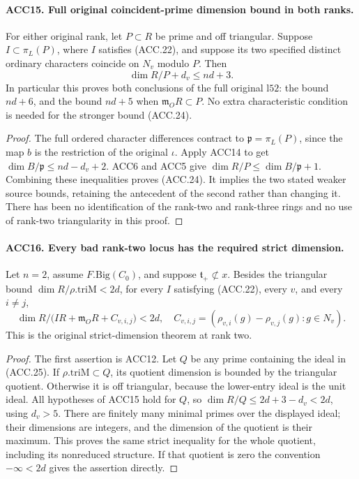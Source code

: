 \paragraph{ACC15. Full original coincident-prime dimension bound in both ranks.}
\label{claim:ACC15}
For either original rank, let \(P\subset R\) be prime and
off triangular.  Suppose \(I\subset\pi_L(P)\), where \(I\)
satisfies (ACC.22), and suppose its two specified distinct ordinary
characters coincide on \(N_v\) modulo \(P\).  Then
\[
                            \dim R/P+d_v\le nd+3.         \tag{ACC.24}
\]
In particular this proves both conclusions of the full original
\(\mathrm{l52}\): the bound \(nd+6\), and the bound \(nd+5\)
when \(\mathfrak m_O R\subset P\).  No extra characteristic
condition is needed for the stronger bound (ACC.24).

\begin{proof}
The full ordered character differences contract to
\(\mathfrak p=\pi_L(P)\), since the map \(b\) is the
restriction of the original \(\iota\).  Apply ACC14 to get
\(\dim B/\mathfrak p\le nd-d_v+2\).  ACC6 and ACC5 give
\(\dim R/P\le\dim B/\mathfrak p+1\).  Combining these
inequalities proves (ACC.24).  It implies the two stated weaker
source bounds, retaining the antecedent of the second rather than
changing it.  There has been no identification of the rank-two and
rank-three rings and no use of rank-two triangularity in this proof.
\end{proof}

\paragraph{ACC16. Every bad rank-two locus has the required strict dimension.}
\label{claim:ACC16}
Let \(n=2\), assume \(F.\mathrm{Big}(C_0)\), and suppose
\(\mathfrak t_+\not\subset x\).  Besides the triangular
bound \(\dim R/\rho.\mathrm{triM}<2d\), for every \(I\)
satisfying (ACC.22), every \(v\), and every \(i\ne j\),
\[
 \dim R/\bigl(IR+\mathfrak m_O R+C_{v,i,j}\bigr)<2d,
 \quad
 C_{v,i,j}=(\rho_{v,i}(g)-\rho_{v,j}(g):g\in N_v).
                                                               \tag{ACC.25}
\]
This is the original strict-dimension theorem at rank two.

\begin{proof}
The first assertion is ACC12.  Let \(Q\) be any prime containing
the ideal in (ACC.25).  If \(\rho.\mathrm{triM}\subset Q\),
its quotient dimension is bounded by the triangular quotient.
Otherwise it is off triangular, because the lower-entry ideal is
the unit ideal.  All hypotheses of ACC15 hold for \(Q\), so
\(\dim R/Q\le2d+3-d_v<2d\), using \(d_v>5\).
There are finitely many minimal primes over the displayed ideal;
their dimensions are integers, and the dimension of the quotient is
their maximum.  This proves the same strict inequality for the whole
quotient, including its nonreduced structure.  If that quotient is
zero the convention \(-\infty<2d\) gives the assertion directly.
\end{proof}

